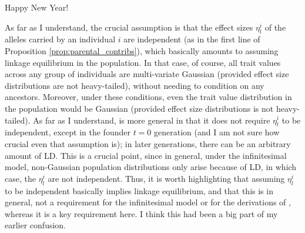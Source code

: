 Happy New Year!




\begin{point}{}
     As far as I understand, the crucial assumption is that the effect sizes $\eta_{l}^{i}$
     of the alleles carried by an individual $i$ are independent
     (as in the first line of Proposition \ref{prop:parental_contribs}),
     which basically amounts to assuming linkage equilibrium in the population.
     In that case, of course, all trait values across any group of individuals are multi-variate Gaussian
     (provided effect size distributions are not heavy-tailed),
     without needing to condition on any ancestors.
     Moreover, under these conditions,
     even the trait value distribution in the population would be Gaussian
     (provided effect size distributions is not heavy-tailed).
     As far as I understand, \citet{barton2017infinitesimal} is more general
     in that it does not require $\eta_{l}^{i}$ to be independent,
     except in the founder $t=0$ generation
     (and I am not sure how crucial even that assumption is);
     in later generations, there can be an arbitrary amount of LD.
     This is a crucial point, since in general, under the infinitesimal model,
     non-Gaussian population distributions only arise because of LD, in which case,
     the $\eta_{l}^{i}$ are not independent.
     Thus, it is worth highlighting that assuming $\eta_{l}^{i}$ to be independent
     basically implies linkage equilibrium, and that this is in general,
     not a requirement for the infinitesimal model
     or for the derivations of \citet{barton2017infinitesimal},
     whereas it is a key requirement here.
     I think this had been a big part of my earlier confusion.
\end{point}


